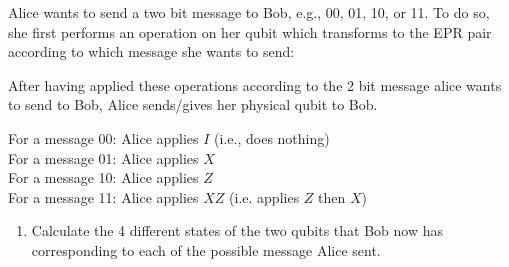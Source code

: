 \documentclass[10pt]{article}
\begin{document}
	Alice wants to send a two bit message to Bob, e.g., 00, 01, 10, or 11. To do so, she first performs an operation 
	on her qubit which transforms to the EPR pair according to which message she wants to send: 

	After having applied these operations according to the 2 bit message alice wants to send to Bob, Alice sends/gives 
	her physical qubit to Bob. 
	
	For a message 00: Alice applies \( I \) (i.e., does nothing)\\
	For a message 01: Alice applies \( X \) \\
	For a message 10: Alice applies \( Z \) \\
	For a message 11: Alice applies \( XZ \) (i.e. applies \( Z \) then \( X \))

	\begin{enumerate}[label=\alph*)]
		\item Calculate the 4 different states of the two qubits that Bob now has corresponding to each of the possible
			message Alice sent. 


\end{enumerate}
\end{document}
